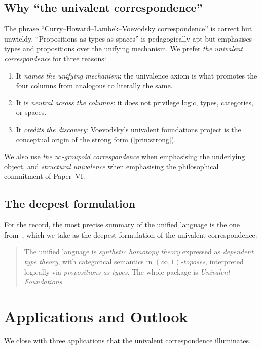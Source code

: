 \documentclass[12pt]{article}
\theoremstyle{definition}
\theoremstyle{remark}
\begin{document}
\subsection{Why ``the univalent correspondence''}

The phrase ``Curry--Howard--Lambek--Voevodsky correspondence'' is correct
but unwieldy. ``Propositions as types as spaces'' is pedagogically apt
but emphasises types and propositions over the unifying mechanism. We
prefer \emph{the univalent correspondence} for three reasons:
\begin{enumerate}
\item It \emph{names the unifying mechanism}: the univalence axiom is
what promotes the four columns from analogous to literally the same.
\item It is \emph{neutral across the columns}: it does not privilege
logic, types, categories, or spaces.
\item It \emph{credits the discovery}: Voevodsky's univalent foundations
project is the conceptual origin of the strong form
(\cref{prin:strong}).
\end{enumerate}

We also use \emph{the $\infty$-groupoid correspondence} when emphasising
the underlying object, and \emph{structural univalence} when emphasising
the philosophical commitment of Paper~VI.

\subsection{The deepest formulation}

For the record, the most precise summary of the unified language is the
one from~\cite{Voevodsky2010,HoTTBook}, which we take as the deepest
formulation of the univalent correspondence:

\begin{quote}
The unified language is \emph{synthetic homotopy theory} expressed as
\emph{dependent type theory}, with categorical semantics in
\emph{$(\infty,1)$-toposes}, interpreted logically via
\emph{propositions-as-types}. The whole package is
\emph{Univalent Foundations}.
\end{quote}

\section{Applications and Outlook}
\label{sec:applications}

We close with three applications that the univalent correspondence
illuminates.
\end{document}
